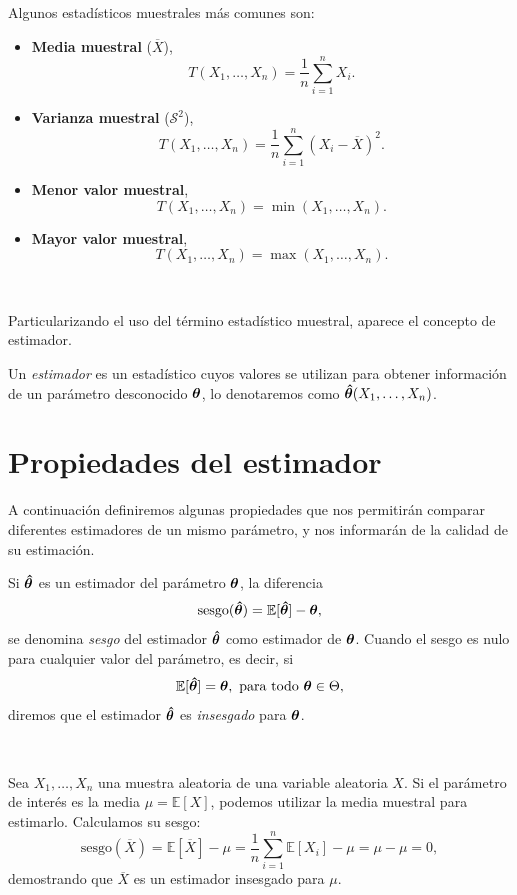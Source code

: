 \documentclass[oneside,openright,titlepage,numbers=noenddot,openany,headinclude,footinclude=true,
cleardoublepage=empty,abstractoff,BCOR=5mm,paper=a4,fontsize=12pt,main=spanish]{scrreprt}
\begin{document}
\begin{example}
Algunos estadísticos muestrales más comunes son:
\begin{itemize}
    \item \textbf{Media muestral} ($\overline{X}$), $$ T(X_1,\dots,X_n)=\frac{1}{n}\sum_{i=1}^n X_i.$$
    \item \textbf{Varianza muestral} ($\mathcal{S}^2$),  $$ T(X_1,\dots,X_n)=\frac{1}{n}\sum_{i=1}^n (X_i-\overline{X})^2.$$
    \item \textbf{Menor valor muestral}, $$ T(X_1,\dots,X_n)=\min (X_1,\dots,X_n).$$
    \item \textbf{Mayor valor muestral},  $$ T(X_1,\dots,X_n)=\max (X_1,\dots,X_n).$$
\end{itemize}
\end{example}\

Particularizando el uso del término estadístico muestral, aparece el concepto de estimador.\\

\begin{definition}[Estimador]
Un \textit{estimador} es un estadístico cuyos valores se utilizan para obtener información de un parámetro desconocido $\bm{\theta}$, lo denotaremos como $\bm{\hat{\theta}} (X_1,\dots,X_n)$.
\end{definition}

\section{Propiedades del estimador}

A continuación definiremos algunas propiedades que nos permitirán comparar diferentes estimadores de un mismo parámetro, y nos informarán de la calidad de su estimación.\\

\begin{definition}
Si $\bm{\hat{\theta}}$ es un estimador del parámetro $\bm{\theta}$, la diferencia $$\text{sesgo}(\bm{\hat{\theta}})=\mathbb{E}[\bm{\hat{\theta}}]-\bm{\theta},$$
se denomina \textit{sesgo} del estimador $\bm{\hat{\theta}}$ como estimador de $\bm{\theta}$. Cuando el sesgo es nulo para cualquier valor del parámetro, es decir, si $$\mathbb{E}[\htheta]=\btheta, \ \text{para todo} \ \btheta \in \Theta,$$
diremos que el estimador $\bm{\hat{\theta}}$ es \textit{insesgado} para $\bm{\theta}$.
\end{definition}\

\begin{example} \label{ex:sesgonul}
Sea $X_1,\dots,X_n$ una muestra aleatoria de una variable aleatoria $X$. Si el parámetro de interés es la media $\mu=\mathbb{E}[X]$, podemos utilizar la media muestral para estimarlo. Calculamos su sesgo: $$\text{sesgo}(\overline{X})=\mathbb{E}[\overline{X}]-\mu=\frac{1}{n}\sum_{i=1}^n \mathbb{E}[X_i]-\mu=\mu-\mu=0,$$
demostrando que $\overline{X}$ es un estimador insesgado para $\mu$.
\end{example}\
\end{document}
